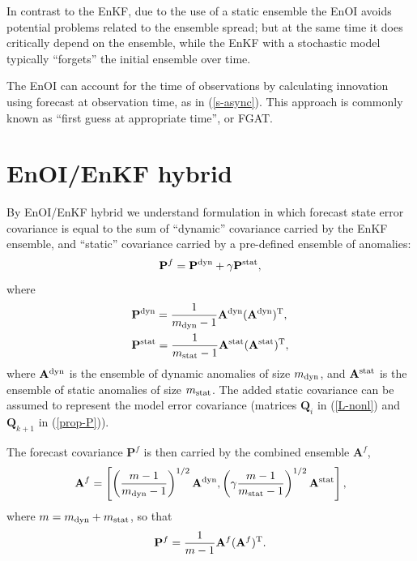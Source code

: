 \documentclass[11pt]{report}
\newcommand{\mb} {\mathbf}
\newcommand{\T}{^{\tiny \mathrm T}}
\newcommand*\suptxt[1]{^{\textnormal{#1}}}
\newcommand*\subtxt[1]{_{\textnormal{#1}}}
\begin{document}
In contrast to the EnKF, due to the use of a static ensemble the EnOI avoids potential problems related to the ensemble spread; but at the same time it does critically depend on the ensemble, while the EnKF with a stochastic model typically ``forgets'' the initial ensemble over time.

The EnOI can account for the time of observations by calculating innovation using forecast at observation time, as in (\ref{s-async}).
This approach is commonly known as ``first guess at appropriate time'', or FGAT.

\section{EnOI/EnKF hybrid}
\label{sec:hybrid-theory}

By EnOI/EnKF hybrid we understand formulation in which forecast state error covariance is equal to the sum of ``dynamic'' covariance carried by the EnKF ensemble, and ``static'' covariance carried by a pre-defined ensemble of anomalies:
\begin{align}
  \mb P^f = \mb P\suptxt{dyn} + \gamma \mb P\suptxt{stat},
\end{align}
where
\begin{align*}
  & \mb P\suptxt{dyn} = \frac{1}{m\subtxt{dyn} - 1}\mb A\suptxt{dyn} (\mb A\suptxt{dyn})\T,\\
  & \mb P\suptxt{stat} = \frac{1}{m\subtxt{stat} - 1}\mb A\suptxt{stat} (\mb A\suptxt{stat})\T,
\end{align*}
where $\mb A\suptxt{dyn}$ is the ensemble of dynamic anomalies of size $m\subtxt{dyn}$, and $\mb A\suptxt{stat}$ is the ensemble of static anomalies of size $m\subtxt{stat}$.
The added static covariance can be assumed to represent the model error covariance (matrices $\mb Q_i$ in (\ref{L-nonl}) and $\mb Q_{k+1}$ in (\ref{prop-P})).

The forecast covariance $\mb P^f$ is then carried by the combined ensemble $\mb A^f$,
\begin{align}
  \label{hybrid_combined}
  \mb A^f = \left[ \left(\frac{m - 1}{m\subtxt{dyn} - 1}\right)^{1/2} \mb A\suptxt{dyn}, \left(\gamma \frac{m - 1}{m\subtxt{stat} - 1}\right)^{1/2} \mb A\suptxt{stat} \right],
\end{align}
where $m = m\subtxt{dyn} + m\subtxt{stat}$, so that
\begin{align*}
  \mb P^f = \frac{1}{m - 1} \mb A^f (\mb A^f)\T.
\end{align*}
\end{document}
